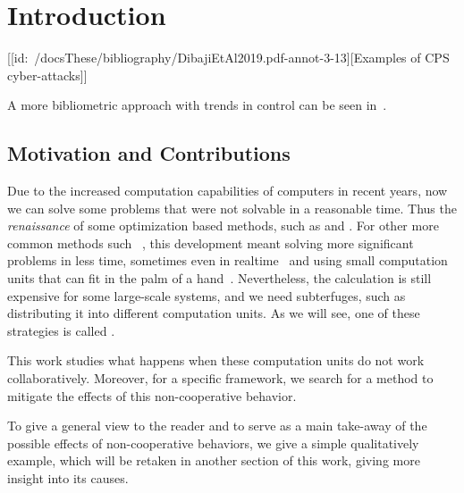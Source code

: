 \documentclass[../main.tex]{subfiles}
\begin{document}
\chapter{Introduction}\label{cha:introduction}
[[id:~/docsThese/bibliography/DibajiEtAl2019.pdf-annot-3-13][Examples of CPS cyber-attacks]]
\cite{DibajiEtAl2019}

A more bibliometric approach with trends in control can be seen in~\cite{ZacchiaEtAl2019}.

\section{Motivation and Contributions}
Due to the increased computation capabilities of computers in recent years, now we can solve some problems that were not solvable in a reasonable time.
Thus the \emph{renaissance} of some optimization based methods, such as  and .
For other more common methods such \mpc~\cite{GarciaEtAl1989}, this development meant solving more significant problems in less time, sometimes even in realtime~ and using small computation units that can fit in the palm of a hand~\cite{BanguraMahony2014}.
Nevertheless, the calculation is still expensive for some large-scale systems, and we need subterfuges, such as distributing it into different computation units.
As we will see, one of these strategies is called \dmpc.

This work studies what happens when these computation units do not work collaboratively.
Moreover, for a specific \dmpc{} framework, we search for a method to mitigate the effects of this non-cooperative behavior.

To give a general view to the reader and to serve as a main take-away of the possible effects of non-cooperative behaviors, we give a simple qualitatively example, which will be retaken in another section of this work, giving more insight into its causes.
\end{document}
